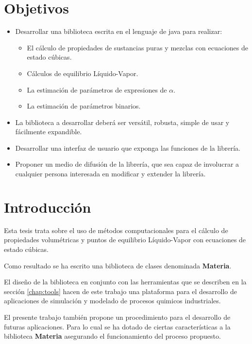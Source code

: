 \chapter{Objetivos}

\begin{itemize}
	\item Desarrollar una biblioteca escrita en el lenguaje de java para realizar:
	\begin{itemize}
		\item El cálculo de propiedades de sustancias puras y mezclas con ecuaciones de estado cúbicas.
		\item Cálculos de equilibrio Líquido-Vapor.
		\item La estimación de parámetros de expresiones de $\alpha$.
		\item La estimación de parámetros binarios.
	\end{itemize}
	\item La biblioteca a desarrollar deberá ser versátil, robusta, simple de usar y fácilmente expandible.
	\item Desarrollar una interfaz de usuario que exponga las funciones de la librería.
	\item Proponer un medio de difusión de la librería, que sea capaz de involucrar a cualquier persona interesada en modificar y extender la librería.
\end{itemize}

\chapter{Introducción}

	Esta tesis trata sobre el uso de métodos computacionales para el cálculo de propiedades volumétricas y puntos de equilibrio Líquido-Vapor con ecuaciones de estado cúbicas. 

	Como resultado se ha escrito una biblioteca de clases denominada \textbf{Materia}.

	El diseño de la biblioteca en conjunto con las herramientas que se describen en la sección \ref{chap:tools} hacen de este trabajo una plataforma para el desarrollo de aplicaciones de simulación y modelado de procesos quimicos industriales.

	El presente trabajo también propone un procedimiento para el desarrollo de futuras aplicaciones. Para lo cual se ha dotado de ciertas características a la biblioteca \textbf{Materia} asegurando el funcionamiento del proceso propuesto.

